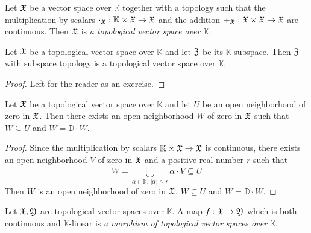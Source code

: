 \begin{definition}
Let ${\mathfrak X}$ be a vector space over $\mathbb{K}$ together with a topology such that the multiplication by scalars $\cdot_{{\mathfrak X}}:\mathbb{K}\times {\mathfrak X} \rightarrow {\mathfrak X}$ and the addition $+_{{\mathfrak X}}:{\mathfrak X}\times {\mathfrak X}\rightarrow {\mathfrak X}$ are continuous. Then ${\mathfrak X}$ is \textit{a topological vector space over $\mathbb{K}$}.
\end{definition}

\begin{fact}\label{fact:topological_vector_subspaces}
Let ${\mathfrak X}$ be a topological vector space over $\mathbb{K}$ and let ${\mathfrak Z}$ be its $\mathbb{K}$-subspace. Then ${\mathfrak Z}$ with subspace topology is a topological vector space over $\mathbb{K}$.
\end{fact}
\begin{proof}
Left for the reader as an exercise.
\end{proof}

\begin{fact}\label{fact:supercircled_open_basis_at_zero}
Let ${\mathfrak X}$ be a topological vector space over $\mathbb{K}$ and let $U$ be an open neighborhood of zero in ${\mathfrak X}$. Then there exists an open neighborhood $W$ of zero in ${\mathfrak X}$ such that $W \subseteq U$ and $W = \mathbb{D}\cdot W$.
\end{fact}
\begin{proof}
Since the multiplication by scalars $\mathbb{K}\times {\mathfrak X} \rightarrow {\mathfrak X}$ is continuous, there exists an open neighborhood $V$ of zero in ${\mathfrak X}$ and a positive real number $r$ such that
$$W = \bigcup_{\alpha\in \mathbb{K},\,|\alpha| \leq r}\alpha \cdot V \subseteq U$$
Then $W$ is an open neighborhood of zero in ${\mathfrak X}$, $W\subseteq U$ and $W = \mathbb{D}\cdot W$.
\end{proof}

\begin{definition}
Let ${\mathfrak X},{\mathfrak Y}$ are topological vector spaces over $\mathbb{K}$. A map $f:{\mathfrak X}\rightarrow {\mathfrak Y}$ which is both continuous and $\mathbb{K}$-linear is \textit{a morphism of topological vector spaces over $\mathbb{K}$}.
\end{definition}

